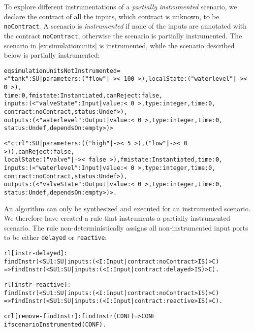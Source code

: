 To explore different instrumentations of a \emph{partially instrumented} scenario, we declare the contract of all the inputs, which contract is unknown, to be \texttt{noContract}.
A scenario is \emph{instrumented} if none of the inputs are annotated with the contract \texttt{noContract}, otherwise the scenario is partially instrumented.
The scenario in \cref{ex:simulationunits} is instrumented, while the scenario described below is partially instrumented:
\scriptsize
\begin{alltt}
eq simulationUnitsNotInstrumented = 
< "tank" : SU | parameters : ("flow" |-> <\,100\,>),  localState : ("waterlevel" |-> <\,0\,>),
                time : 0,  fmistate : Instantiated, canReject : false, 
                inputs : (< "valveState" : Input | value : <\,0\,>, type : integer, time : 0,
                                                   contract : noContract, status : Undef >), 
                outputs : (< "waterlevel" : Output | value : <\,0\,>, type : integer, time : 0,
                                                     status : Undef, dependsOn : empty >) >

< "ctrl" : SU | parameters : (("high" |-> <\,5\,>) , ("low" |-> <\,0\,>)), canReject : false, 
                localState : ("valve" |-> <\,false\,>), fmistate : Instantiated, time : 0, 
                inputs : (< "waterlevel" : Input | value : <\,0\,>, type : integer, time : 0,
                                                   contract : noContract, status : Undef >), 
                outputs : (< "valveState" : Output | value : <\,0\,>, type : integer, time : 0,
                                                     status : Undef, dependsOn : empty >) > . 

\end{alltt}
\normalsize

An algorithm can only be synthesized and executed for an instrumented scenario. We therefore have created a rule that instruments a partially instrumented scenario.
The rule non-deterministically assigns all non-instrumented input ports to be either \texttt{delayed} or \texttt{reactive}:

\scriptsize
\begin{alltt}
rl [instr-delayed]: 
  findInstr(< SU1 : SU | inputs : (< I : Input | contract : noContract > IS) > C)
  => findInstr(< SU1 : SU | inputs : (< I : Input | contract : delayed > IS) > C) .

rl [instr-reactive]: 
  findInstr(< SU1 : SU | inputs : (< I : Input | contract :   noContract > IS) > C)
  => findInstr(< SU1 : SU | inputs : (< I : Input | contract : reactive > IS) > C) .

crl [remove-findInstr]: findInstr(CONF) => CONF 
  if scenarioInstrumented(CONF) .
\end{alltt}
\normalsize

